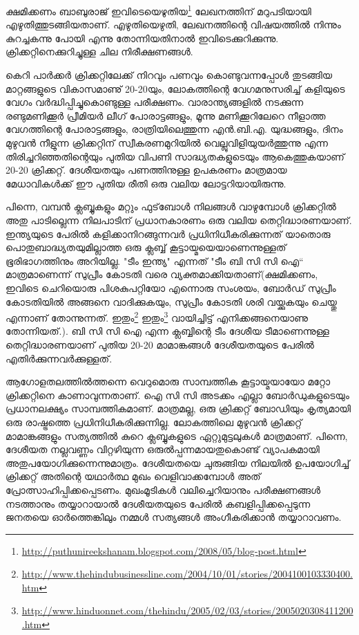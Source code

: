 \vskip 2pt

ക്ഷമിക്കണം ബാബുരാജ് ഇവിടെയെഴുതിയ\footnote{\url{http://puthunireekshanam.blogspot.com/2008/05/blog-post.html}} 
ലേഖനത്തിന് മറുപടിയായി എഴുതിത്തുടങ്ങിയതാണ്. എഴുതിയെഴുതി, ലേഖനത്തിന്റെ വിഷയത്തില്‍ നിന്നും കുറച്ചകന്നു 
പോയി എന്നു തോന്നിയതിനാല്‍ ഇവിടെക്കുറിക്കുന്നു. ക്രിക്കറ്റിനെക്കുറിച്ചുള്ള ചില നിരീക്ഷണങ്ങള്‍.

കെറി പാര്‍ക്കര്‍ ക്രിക്കറ്റിലേക്ക് നിറവും പണവും കൊണ്ടുവന്നപ്പോള്‍ തുടങ്ങിയ മാറ്റങ്ങളുടെ വികാസമാണു് 20-20യും, 
ലോകത്തിന്റെ വേഗമനുസരിച്ച് കളിയുടെ വേഗം വര്‍ദ്ധിപ്പിച്ചുകൊണ്ടുള്ള പരീക്ഷണം. വാരാന്ത്യങ്ങളില്‍ നടക്കുന്ന 
രണ്ടുമണിക്കൂര്‍ പ്രീമിയര്‍ ലീഗ് പോരാട്ടങ്ങളും, മൂന്നു മണിക്കൂറിലേറെ നീളാത്ത വേഗത്തിന്റെ പോരാട്ടങ്ങളും, 
രാത്രിയിലെത്തുന്ന എന്‍.ബി.എ. യുദ്ധങ്ങളും, ദിനം മുഴുവന്‍ നീളുന്ന ക്രിക്കറ്റിന് സ്വീകരണമുറിയില്‍ വെല്ലുവിളിയുയര്‍ത്തുന്നു 
എന്ന തിരിച്ചറിഞ്ഞതിന്റെയും പുതിയ വിപണി സാദ്ധ്യതകളുടെയും ആകെത്തുകയാണ് 20-20 ക്രിക്കറ്റ്. 
ദേശീയതയും പണത്തിനുള്ള ഉപകരണം മാത്രമായ മേധാവികള്‍ക്ക് ഈ പുതിയ രീതി ഒരു വലിയ ലോട്ടറിയായിരുന്നു.

പിന്നെ, വമ്പന്‍ ക്ലബ്ബുകളും മറ്റും ഫുട്‌ബോള്‍ നിലങ്ങള്‍ വാഴുമ്പോള്‍ ക്രിക്കറ്റില്‍ അതു പാടില്ലെന്ന നിലപാടിന് 
പ്രധാനകാരണം ഒരു വലിയ തെറ്റിദ്ധാരണയാണ്. ഇന്ത്യയുടെ പേരില്‍ കളിക്കാനിറങ്ങുന്നവര്‍ പ്രധിനിധീകരിക്കുന്നത് 
യാതൊരു പൊതുബാദ്ധ്യതയുമില്ലാത്ത ഒരു ക്ലബ്ബ് കൂട്ടായ്മയെയാണെന്നുള്ളത് ഭൂരിഭാഗത്തിനും അറിയില്ല. "ടീം ഇന്ത്യ" എന്നത് "ടീം ബി സി സി ഐ`` 
മാത്രമാണെന്ന് സുപ്രീം കോടതി വരെ വ്യക്തമാക്കിയതാണ്(ക്ഷമിക്കണം, ഇവിടെ ചെറിയൊരു പിശകുപറ്റിയോ എന്നൊരു സംശയം, 
ബോര്‍ഡ് സുപ്രീം കോടതിയില്‍ അങ്ങനെ വാദിക്കുകയും, സുപ്രീം കോടതി ശരി വയ്ക്കുകയും ചെയ്തു എന്നാണ് തോന്നുന്നത്. 
ഇതും\footnote{\url{http://www.thehindubusinessline.com/2004/10/01/stories/2004100103330400.htm}} 
ഇതും\footnote{\url{http://www.hinduonnet.com/thehindu/2005/02/03/stories/2005020308411200.htm}} 
വായിച്ചിട്ട് എനിക്കങ്ങനെയാണു തോന്നിയത്.). ബി സി സി ഐ എന്ന ക്ലബ്ബിന്റെ ടീം ദേശീയ ടീമാണെന്നുള്ള 
തെറ്റിദ്ധാരണയാണ് പുതിയ 20-20 മാമാങ്കങ്ങള്‍ ദേശീയതയുടെ പേരില്‍ എതിര്‍ക്കുന്നവര്‍ക്കുള്ളത്.

ആഗോളതലത്തില്‍ത്തന്നെ വെറുമൊരു സാമ്പത്തിക കൂട്ടായ്മയായോ മറ്റോ ക്രിക്കറ്റിനെ കാണാവുന്നതാണ്. 
ഐ സി സി അടക്കം എല്ലാ ബോര്‍ഡുകളുടെയും പ്രധാനലക്ഷ്യം സാമ്പത്തികമാണ്. മാത്രമല്ല, ഒരു ക്രിക്കറ്റ് ബോഡിയും 
കൃത്യമായി ഒരു രാഷ്ട്രത്തെ പ്രധിനിധീകരിക്കുന്നില്ല. ലോകത്തിലെ മുഴുവന്‍ ക്രിക്കറ്റ് മാമാങ്കങ്ങളും സത്യത്തില്‍ കുറെ 
ക്ലബ്ബുകളുടെ ഏറ്റുമുട്ടലുകള്‍ മാത്രമാണ്. പിന്നെ, ദേശീയത നല്ലവണ്ണം വിറ്റഴിയുന്ന ഒരുല്‍പ്പന്നമായതുകൊണ്ട് വ്യാപകമായി 
അതുപയോഗിക്കുന്നെന്നുമാത്രം. ദേശീയതയെ ചുരുങ്ങിയ നിലയില്‍ ഉപയോഗിച്ച് ക്രിക്കറ്റ് അതിന്റെ യഥാര്‍ത്ഥ മുഖം 
വെളിവാക്കമ്പോള്‍ അത് പ്രോത്സാഹിപ്പിക്കപ്പെടണം. മുഖംമൂടികള്‍ വലിച്ചെറിയാനും പരീക്ഷണങ്ങള്‍ നടത്താനും 
തയ്യാറായാല്‍ ദേശീയതയുടെ പേരില്‍ കബളിപ്പിക്കപ്പെടുന്ന ജനതയെ ഓര്‍ത്തെങ്കിലും നമ്മള്‍ സത്യങ്ങള്‍ അംഗീകരിക്കാന്‍ 
തയ്യാറാവണം.

